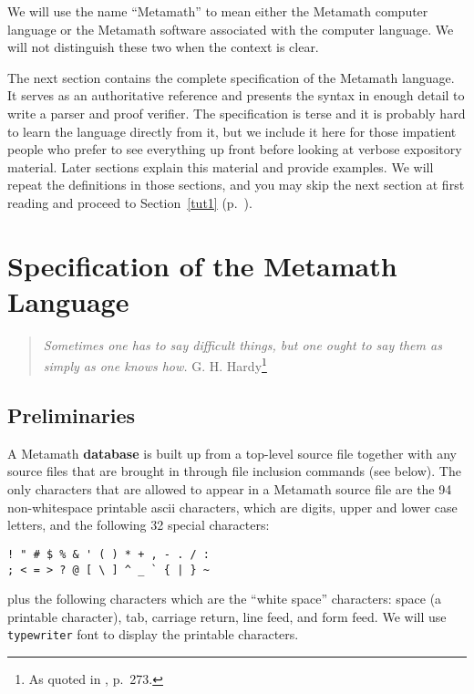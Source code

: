 We will use the name ``Metamath'' to mean either the Metamath
computer language or the Metamath software associated with the computer
language.  We will not distinguish these two when the context is clear.

The next section contains the complete specification of the Metamath
language.
It serves as an
authoritative reference and presents the syntax in enough detail to
write a parser and proof verifier.  The
specification is terse and it is probably hard to learn the language
directly from it, but we include it here for those impatient people who
prefer to see everything up front before looking at verbose expository
material.  Later sections explain this material and provide examples.
We will repeat the definitions in those sections, and you may skip the
next section at first reading and proceed to Section~\ref{tut1}
(p.~\pageref{tut1}).

\section{Specification of the Metamath Language}\label{spec}

\begin{quote}
  {\em Sometimes one has to say difficult things, but one ought to say
them as simply as one knows how.}
    \flushright\sc  G. H. Hardy\footnote{As quoted in
    \cite{deMillo}, p.~273.}\\
\end{quote}

\subsection{Preliminaries}\label{spec1}

A Metamath {\bf database} is built up from a top-level source
file together with any source files that are brought in through file inclusion
commands (see below).  The only characters that are allowed to appear in a
Metamath source file are the 94 non-whitespace printable {\sc
ascii} characters, which are digits, upper and lower
case letters, and the following 32 special
characters:\label{spec1chars}

\begin{verbatim}
! " # $ % & ' ( ) * + , - . / :
; < = > ? @ [ \ ] ^ _ ` { | } ~
\end{verbatim}
plus the following characters which are the ``white space'' characters:
space (a printable character),
tab, carriage return, line feed, and form feed.\label{whitespace}
We will use \texttt{typewriter}
font to display the printable characters.


